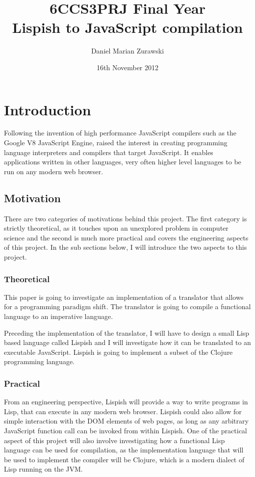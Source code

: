\documentclass[11pt]{informatics-report}
\title{6CCS3PRJ Final Year\\\vspace{0.2cm}Lispish to JavaScript compilation}
\author{Daniel Marian Zurawski}
\date{16th November 2012}
\begin{document}
\createFrontMatter
\onehalfspacing
\tableofcontents
\doublespacing


\chapter{Introduction}
Following the invention of high performance JavaScript compilers such as the Google V8 JavaScript Engine, raised the interest in creating programming language interpreters and compilers that target JavaScript. It enables applications written in other languages, very often higher level languages to be run on any modern web browser. \\
 
 \section{Motivation}
There are two categories of motivations behind this project. The first category is strictly theoretical, as it touches upon an unexplored problem in computer science and the second is much more practical and covers the engineering aspects of this project. In the sub sections below, I will introduce the two aspects to this project. 

\subsection{Theoretical}
This paper is going to investigate an implementation of a translator that allows for a programming paradigm shift. The translator is going to compile a functional language to an imperative language. 

Preceding the implementation of the translator, I will have to design a small Lisp based language called Lispish and I will investigate how it can be translated to an executable JavaScript. Lispish is going to implement a subset of the Clojure programming language.

\subsection{Practical}
From an engineering perspective, Lispish will provide a way to write programs in Lisp, that can execute in any modern web browser. Lispish could also allow for simple interaction with the DOM elements of web pages, as long as any arbitrary JavaScript function call can be invoked from within Lispish.
One of the practical aspect of this project will also involve investigating how a functional Lisp language can be used for compilation, as the implementation language that will be used to implement the compiler will be Clojure, which is a modern dialect of Lisp running on the JVM.  
\end{document}
